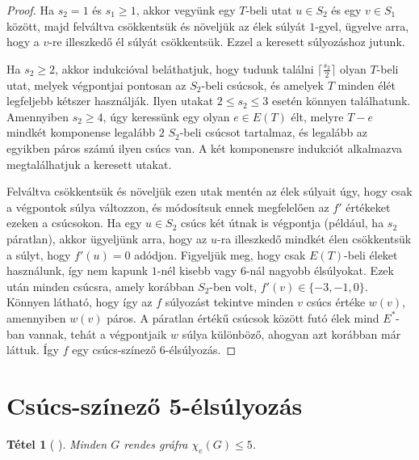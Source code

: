 \documentclass[12pt, a4paper]{report}
\newtheorem{tét}{Tétel}[section]
\theoremstyle{remark}
\theoremstyle{definition}
\begin{document}
\begin{proof}
Ha $s_2 = 1$ és $s_1 \geq 1$, akkor vegyünk egy $T$-beli utat $u \in S_2$ és egy $v \in S_1$ között, majd felváltva csökkentsük és növeljük az élek súlyát $1$-gyel, ügyelve arra, hogy a $v$-re illeszkedő él súlyát csökkentsük. Ezzel a keresett súlyozáshoz jutunk.

Ha $s_2 \geq 2$, akkor indukcióval beláthatjuk, hogy tudunk találni $\lceil \frac{s_2}{2} \rceil$ olyan $T$-beli utat, melyek végpontjai pontosan az $S_2$-beli csúcsok, és amelyek $T$ minden élét legfeljebb kétszer használják. Ilyen utakat $2 \leq s_2 \leq 3$ esetén könnyen találhatunk. Amennyiben $s_2 \geq 4$, úgy keressünk egy olyan $e \in E(T)$ élt, melyre $T-e$ mindkét komponense legalább $2$ $S_2$-beli csúcsot tartalmaz, és legalább az egyikben páros számú ilyen csúcs van. A két komponensre indukciót alkalmazva megtalálhatjuk a keresett utakat.

Felváltva csökkentsük és növeljük ezen utak mentén az élek súlyait úgy, hogy csak a végpontok súlya változzon, és módosítsuk ennek megfelelően az $f'$ értékeket ezeken a csúcsokon. Ha egy $u \in S_2$ csúcs két útnak is végpontja (például, ha $s_2$ páratlan), akkor ügyeljünk arra, hogy az $u$-ra illeszkedő mindkét élen csökkentsük a súlyt, hogy $f'(u) = 0$ adódjon. Figyeljük meg, hogy csak $E(T)$-beli éleket használunk, így nem kapunk $1$-nél kisebb vagy $6$-nál nagyobb élsúlyokat. Ezek után minden csúcsra, amely korábban $S_2$-ben volt, $f'(v) \in \lbrace -3, -1, 0 \rbrace$. Könnyen látható, hogy így az $f$ súlyozást tekintve minden $v$ csúcs értéke $w(v)$, amennyiben $w(v)$ páros. A páratlan értékű csúcsok között futó élek mind $E^*$-ban vannak, tehát a végpontjaik $w$ súlya különböző, ahogyan azt korábban már láttuk. Így $f$ egy csúcs-színező $6$-élsúlyozás.
\end{proof}

\section{Csúcs-színező 5-élsúlyozás}
\begin{tét}[\citeauthor{Kalkowski2010} \cite{Kalkowski2010}]
Minden $G$ rendes gráfra $\chi_e(G) \leq 5$.
\end{tét}
\end{document}
